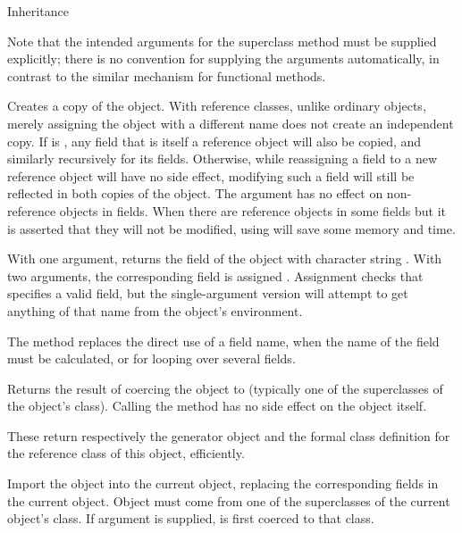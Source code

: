 \begin{Section}{Inheritance}
\begin{description}
Note that the intended arguments for the superclass method must be
supplied explicitly; there is no convention for supplying the
arguments automatically, in contrast to the similar mechanism for
functional methods.


\item[\code{\$copy(shallow = FALSE)}]  
Creates a copy of the object.  With reference classes, unlike ordinary
\R{} objects, merely assigning the object with a different name does not
create an independent copy.  If  is , any
field that is itself a reference object will also be copied, and
similarly recursively for its fields.  Otherwise, while reassigning a
field to a new reference object will have no side effect, modifying
such a field will still be reflected in both copies of the object.
The argument has no effect on non-reference objects in fields.  When
there are reference objects in some fields but it is asserted that
they will not be modified, using  will save some
memory and time.


\item[\code{\$field(name, value)}]  
With one argument, returns the field of the object with character
string .  With two arguments, the corresponding field is
assigned .  Assignment checks that  specifies a
valid field, but the single-argument version will attempt to get
anything of that name from the object's environment.

The  
method replaces the direct use of a field name, when the name of the
field must be calculated, or for looping over several fields.


\item[\code{\$export(Class)}]  
Returns the result of coercing the object to  (typically
one of the superclasses of the object's class).  Calling the method
has no side effect on the object itself.


\item[\code{\$getRefClass()}; \code{\$getClass()}] 
These return respectively the generator object and the formal class
definition for the reference class of this object, efficiently.




\item[\code{\$import(value, Class = class(value))}]  
Import the object  into the current object, replacing the
corresponding fields in the current object.
Object  must come from one of the superclasses of the
current object's class.
If argument  is supplied,  is first coerced to
that class.



\end{description}
\end{Section}
